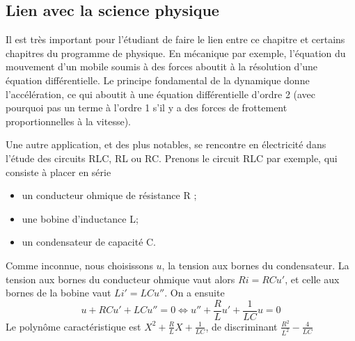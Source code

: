 \documentclass[french]{book}
\theoremstyle{plain}
\theoremstyle{definition}
\theoremstyle{remark}
\begin{document}
\subsection{Lien avec la science physique}
Il est très important pour l'étudiant de faire le lien entre ce chapitre et certains chapitres du programme de physique. En mécanique par exemple, l'équation du mouvement d'un mobile soumis à des forces aboutit à la résolution d'une équation différentielle. Le principe fondamental de la dynamique donne l'accélération, ce qui aboutit à une équation différentielle d'ordre 2 (avec pourquoi pas un terme à l'ordre 1 s'il y a des forces de frottement proportionnelles à la vitesse). \\ \par
Une autre application, et des plus notables, se rencontre en électricité dans l'étude des circuits RLC, RL ou RC. Prenons le circuit RLC par exemple, qui consiste à placer en série
\begin{itemize}
	\item un conducteur ohmique de résistance R ;
	\item une bobine d'inductance L; 
	\item un condensateur de capacité C.
\end{itemize}
Comme inconnue, nous choisissons $u$, la tension aux bornes du condensateur. La tension aux bornes du conducteur ohmique vaut alors $Ri = RCu'$, et celle aux bornes de la bobine vaut $Li' = LCu''$. On a ensuite $$u + RCu' + LCu'' = 0 \iff u'' + \frac{R}{L}u' + \frac{1}{LC}u = 0$$ Le polynôme caractéristique est $\displaystyle X^2 + \frac{R}{L}X + \frac{1}{LC}$, de discriminant $\displaystyle\frac{R^2}{L^2} - \frac{4}{LC}$
\end{document}
